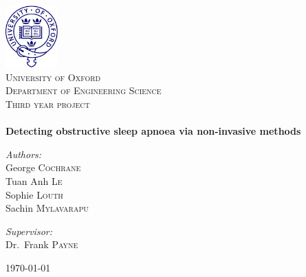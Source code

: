 \begin{titlepage}
\begin{center}

~\\[2cm]
\includegraphics[width=0.15\textwidth]{drawings/oxford.pdf}\\[1cm]

\textsc{\LARGE University of Oxford}\\
\textsc{\Large Department of Engineering Science}\\[1cm]

\textsc{\Large Third year project}\\[0.5cm]

\HRule \\[0.4cm]
{\huge \bfseries Detecting obstructive sleep apnoea via non-invasive methods}
\HRule \\[1.5cm]

\begin{minipage}{0.4\textwidth}
\begin{flushleft} \large
\emph{Authors:}\\
George \textsc{Cochrane}\\
Tuan Anh \textsc{Le}\\
Sophie \textsc{Louth}\\
Sachin \textsc{Mylavarapu}
\end{flushleft}
\end{minipage}
\begin{minipage}{0.4\textwidth}
\begin{flushright} \large
\emph{Supervisor:} \\
Dr.~Frank \textsc{Payne}
\end{flushright}
\end{minipage}

\vfill

{\large \today}

\end{center}
\end{titlepage}